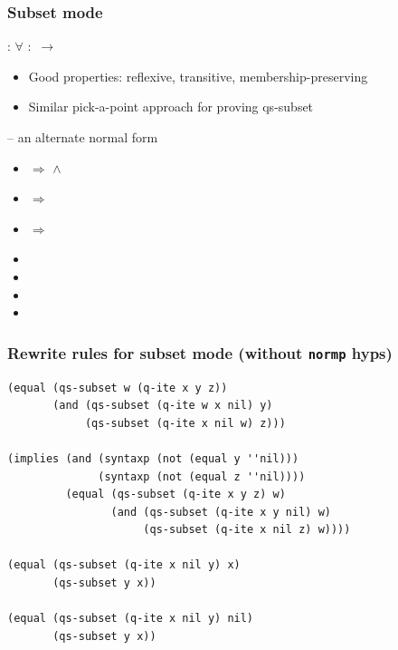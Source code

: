 \begin{frame}[fragile]
\frametitle{Subset mode}

: $\forall$  $:$  $\rightarrow$ 

\begin{itemize}
\item Good properties: reflexive, transitive, membership-preserving
\item Similar pick-a-point approach for proving qs-subset
\end{itemize}

\SmallSkip
{} -- an alternate normal form
\begin{itemize}
\item {} $\Rightarrow$  $\wedge$ 
\item {} $\Rightarrow$ 
\item {} $\Rightarrow$  \\
\quad
\item {}
\item {}
\item {}
\item {}
\end{itemize}
\end{frame}



\begin{frame}[fragile]
\frametitle{Rewrite rules for subset mode (without {\tt normp} hyps)}
\begin{verbatim}
(equal (qs-subset w (q-ite x y z))
       (and (qs-subset (q-ite w x nil) y)
            (qs-subset (q-ite x nil w) z)))

(implies (and (syntaxp (not (equal y ''nil)))
              (syntaxp (not (equal z ''nil))))
         (equal (qs-subset (q-ite x y z) w)
                (and (qs-subset (q-ite x y nil) w)
                     (qs-subset (q-ite x nil z) w))))

(equal (qs-subset (q-ite x nil y) x)
       (qs-subset y x))

(equal (qs-subset (q-ite x nil y) nil)
       (qs-subset y x))
\end{verbatim}
\end{frame}


